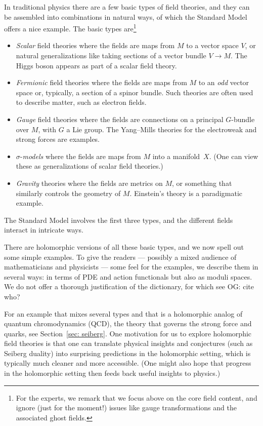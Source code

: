\documentclass[11pt]{amsart}
\def\owen#1{{\textcolor{violet!65!black}{OG: {#1}}}}
\begin{document}
In traditional physics there are a few basic types of field theories, 
and they can be assembled into combinations in natural ways,
of which the Standard Model offers a nice example.
The basic types are\footnote{For the experts, we remark that we focus above on the core field content, and ignore (just for the moment!) issues like gauge transformations and the associated ghost fields.}
\begin{itemize}
\item {\em Scalar} field theories where the fields are maps from $M$ to a vector space $V$, or natural generalizations like taking sections of a vector bundle $V \to M$. The Higgs boson appears as part of a scalar field theory.
\item {\em Fermionic} field theories where the fields are maps from $M$ to an {\em odd} vector space or, typically, a section of a spinor bundle. Such theories are often used to describe matter, such as electron fields.
\item {\em Gauge} field theories where the fields are connections on a principal $G$-bundle over $M$, with $G$ a Lie group. The Yang--Mills theories for the electroweak and strong forces are examples.
\item $\sigma$-{\em models} where the fields are maps from $M$ into a manifold~$X$. (One can view these as generalizations of scalar field theories.)
\item {\em Gravity} theories where the fields are metrics on $M$, or something that similarly controls the geometry of $M$. Einstein's theory is a paradigmatic example.
\end{itemize}
The Standard Model involves the first three types,
and the different fields interact in intricate ways.

There are holomorphic versions of all these basic types, 
and we now spell out some simple examples.
To give the readers --- possibly a mixed audience of mathematicians and physicists --- some feel for the examples, 
we describe them in several ways: 
in terms of PDE and action functionals but also as moduli spaces.
We do not offer a thorough justification of the dictionary, for which see \owen{cite who?}

For an example that mixes several types and that is a holomorphic analog of quantum chromodynamics (QCD), the theory that governs the strong force and quarks,
see Section~\ref{sec: seiberg}.
One motivation for us to explore holomorphic field theories is that one can translate physical insights and conjectures (such as Seiberg duality) into surprising predictions in the holomorphic setting,
which is typically much cleaner and more accessible.
(One might also hope that progress in the holomorphic setting then feeds back useful insights to physics.)
\end{document}
